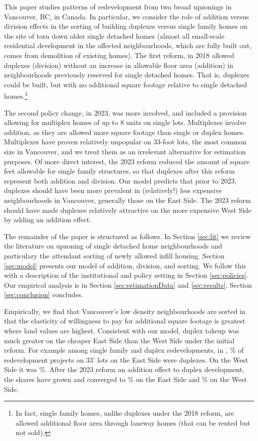 \documentclass[12pt]{article}
\begin{document}
This paper studies patterns of redevelopment from two broad upzonings in
Vancouver, BC, in Canada. In particular, we consider the role of addition
versus division effects in the sorting of building duplexes versus single
family homes on the site of torn down older single detached homes (almost all
small-scale residential development in the affected neighbourhoods, which are
fully built out, comes from demolition of existing homes). The first reform, in
2018 allowed duplexes (division) without an increase in allowable floor area
(addition) in neighbourhoods previously reserved for single detached homes.
That is, duplexes could be built, but with no additional square footage
relative to single detached homes.\footnote{In fact, single family homes,
unlike duplexes under the 2018 reform, are allowed additional floor area
through laneway homes (that can be rented but not sold).} 

The second policy change, in 2023, was more involved, and included a provision
allowing for multiplex homes of up to 8 units on single lots.  Multiplexes
involve addition, as they are allowed more square footage than single or duplex
homes.  Multiplexes have proven relatively unpopular on 33-foot lots, the most
common size in Vancouver, and we treat them as an irrelevant alternative for
estimation purposes. Of more direct interest, the 2023 reform reduced the
amount of square feet allowable for single family structures, so that duplexes
after this reform represent both addition and division. Our model predicts that
prior to 2023, duplexes should have been more prevalent in (relatively!) less
expensive neighbourhoods in Vancouver, generally those on the East Side. The
2023 reform should have made duplexes relatively attractive on the more
expensive West Side by adding an addition effect. 

The remainder of the paper is structured as follows. In Section \ref{sec:lit}
we review the literature on upzoning of single detached home neighbourhoods and
particulary the attendant sorting of newly allowed infill housing. Section
\ref{sec:model} presents our model of addition, division, and sorting. We
follow this with a description of the institutional and policy setting in
Section \ref{sec:policies}. Our empirical analysis is in Section
\ref{sec:estimationData} and \ref{sec:results}. Section \ref{sec:conclusion} concludes. 

Empirically, we find that Vancouver's low density neighbourhoods are sorted in
that the elasticity of willingness to pay for additional square footage is
greatest where land values are highest. Consistent with our model, duplex
takeup was much greater on the cheaper East Side than the West Side under the initial reform. For
example among single family and duplex redevelopments, in \ewPreYear, \ewDupEastPreYear\% of
redevelopment projects on 33' lots on the East Side were duplexes. On the West
Side it was \ewDupWestPreYear\%. After the 2023 reform an addition effect to duplex
development, the shares have grown and converged to \ewDupEastPost\% on the East Side and
\ewDupWestPost\% on the West Side.
\end{document}

